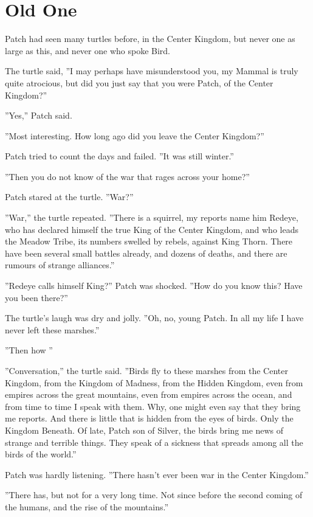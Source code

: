 \documentclass[12pt]{book}
\begin{document}
\section{Old One}

 Patch had seen many turtles before, in the Center Kingdom, but never one as large as this, and never one who spoke Bird.\par
 The turtle said, ''I may perhaps have misunderstood you, my Mammal is truly quite atrocious, but did you just say that you were Patch, of the Center Kingdom?''\par
 ''Yes,'' Patch said.\par
 ''Most interesting. How long ago did you leave the Center Kingdom?''\par
 Patch tried to count the days and failed. ''It was still winter.''\par
 ''Then you do not know of the war that rages across your home?''\par
 Patch stared at the turtle. ''War?''\par
 ''War,'' the turtle repeated. ''There is a squirrel, my reports name him Redeye, who has declared himself the true King of the Center Kingdom, and who leads the Meadow Tribe, its numbers swelled by rebels, against King Thorn. There have been several small battles already, and dozens of deaths, and there are rumours of strange alliances.''\par
 ''Redeye calls himself King?'' Patch was shocked. ''How do you know this? Have you been there?''\par
 The turtle's laugh was dry and jolly. ''Oh, no, young Patch. In all my life I have never left these marshes.''\par
''Then how %
''\par
''Conversation,'' the turtle said. ''Birds fly to these marshes from the Center Kingdom, from the Kingdom of Madness, from the Hidden Kingdom, even from empires across the great mountains, even from empires across the ocean, and from time to time I speak with them. Why, one might even say that they bring me reports. And there is little that is hidden from the eyes of birds. Only the Kingdom Beneath. Of late, Patch son of Silver, the birds bring me news of strange and terrible things. They speak of a sickness that spreads among all the birds of the world.''\par
 Patch was hardly listening. ''There hasn't ever been war in the Center Kingdom.''\par
 ''There has, but not for a very long time. Not since before the second coming of the humans, and the rise of the mountains.''\par
\end{document}
